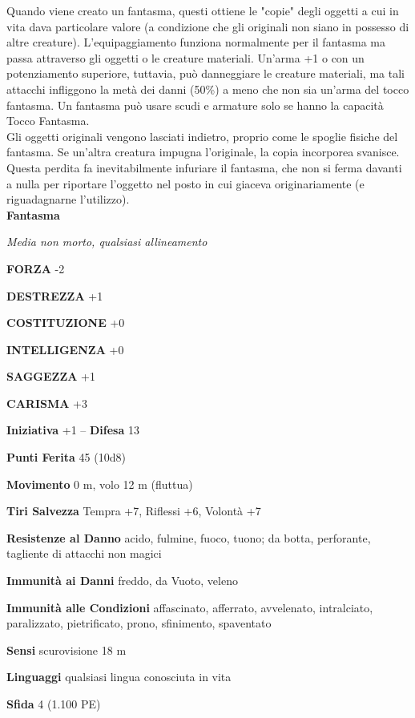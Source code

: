 \begin{multicols}{2}
Quando viene creato un fantasma, questi ottiene le "copie" degli oggetti a cui in vita dava particolare valore (a condizione che gli originali non siano in possesso di altre creature). L'equipaggiamento funziona normalmente per il fantasma ma passa attraverso gli oggetti o le creature materiali. Un'arma +1 o con un potenziamento superiore, tuttavia, può danneggiare le creature materiali, ma tali attacchi infliggono la metà dei danni (50\%) a meno che non sia un'arma del tocco fantasma. Un fantasma può usare scudi e armature solo se hanno la capacità Tocco Fantasma.\\

Gli oggetti originali vengono lasciati indietro, proprio come le spoglie fisiche del fantasma. Se un'altra creatura impugna l'originale, la copia incorporea svanisce. Questa perdita fa inevitabilmente infuriare il fantasma, che non si ferma davanti a nulla per riportare l'oggetto nel posto in cui giaceva originariamente (e riguadagnarne l'utilizzo).\\

\medskip{}\textbf{Fantasma}

\emph{Media non morto, qualsiasi allineamento}

\textbf{FORZA} -2

\textbf{DESTREZZA} +1

\textbf{COSTITUZIONE} +0

\textbf{INTELLIGENZA} +0

\textbf{SAGGEZZA} +1

\textbf{CARISMA} +3

\textbf{Iniziativa} +1 -- \textbf{Difesa} 13

\textbf{Punti Ferita} 45 (10d8)

\textbf{Movimento} 0 m, volo 12 m (fluttua)

\textbf{Tiri Salvezza} Tempra +7, Riflessi +6, Volontà +7

\textbf{Resistenze al Danno} acido, fulmine, fuoco, tuono; da botta, perforante, tagliente di attacchi non magici

\textbf{Immunità ai Danni} freddo, da Vuoto, veleno

\textbf{Immunità alle Condizioni} affascinato, afferrato, avvelenato, intralciato, paralizzato, pietrificato, prono, sfinimento, spaventato

\textbf{Sensi} scurovisione 18 m

\textbf{Linguaggi} qualsiasi lingua conosciuta in vita

\textbf{Sfida} 4 (1.100 PE)


\end{multicols}
